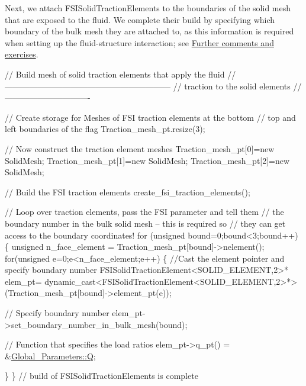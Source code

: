 Next, we attach {\ttfamily F\+S\+I\+Solid\+Traction\+Elements} to the boundaries of the solid mesh that are exposed to the fluid. We complete their build by specifying which boundary of the bulk mesh they are attached to, as this information is required when setting up the fluid-\/structure interaction; see \hyperlink{index_com_ex}{Further comments and exercises}.


\begin{DoxyCodeInclude}


 \textcolor{comment}{// Build mesh of solid traction elements that apply the fluid}
 \textcolor{comment}{//------------------------------------------------------------}
 \textcolor{comment}{// traction to the solid elements}
 \textcolor{comment}{//-------------------------------}

 \textcolor{comment}{// Create storage for Meshes of FSI traction elements at the bottom}
 \textcolor{comment}{// top and left boundaries of the flag}
 Traction\_mesh\_pt.resize(3);
 
 \textcolor{comment}{// Now construct the traction element meshes}
 Traction\_mesh\_pt[0]=\textcolor{keyword}{new} SolidMesh;
 Traction\_mesh\_pt[1]=\textcolor{keyword}{new} SolidMesh;
 Traction\_mesh\_pt[2]=\textcolor{keyword}{new} SolidMesh;

 \textcolor{comment}{// Build the FSI traction elements}
 create\_fsi\_traction\_elements();

 \textcolor{comment}{// Loop over traction elements, pass the FSI parameter and tell them }
 \textcolor{comment}{// the boundary number in the bulk solid mesh -- this is required so }
 \textcolor{comment}{// they can get access to the boundary coordinates!}
 \textcolor{keywordflow}{for} (\textcolor{keywordtype}{unsigned} bound=0;bound<3;bound++)
  \{
   \textcolor{keywordtype}{unsigned} n\_face\_element = Traction\_mesh\_pt[bound]->nelement();
   \textcolor{keywordflow}{for}(\textcolor{keywordtype}{unsigned} e=0;e<n\_face\_element;e++)
    \{
     \textcolor{comment}{//Cast the element pointer and specify boundary number}
     FSISolidTractionElement<SOLID\_ELEMENT,2>* elem\_pt=
     \textcolor{keyword}{dynamic\_cast<}FSISolidTractionElement<SOLID\_ELEMENT,2>*\textcolor{keyword}{>}
      (Traction\_mesh\_pt[bound]->element\_pt(e));

     \textcolor{comment}{// Specify boundary number}
     elem\_pt->set\_boundary\_number\_in\_bulk\_mesh(bound);

     \textcolor{comment}{// Function that specifies the load ratios}
     elem\_pt->q\_pt() = &\hyperlink{namespaceGlobal__Parameters_a7814fddf663e56168174a42d2cd6b4c1}{Global\_Parameters::Q};
    
    \}
  \} \textcolor{comment}{// build of FSISolidTractionElements is complete}

\end{DoxyCodeInclude}


